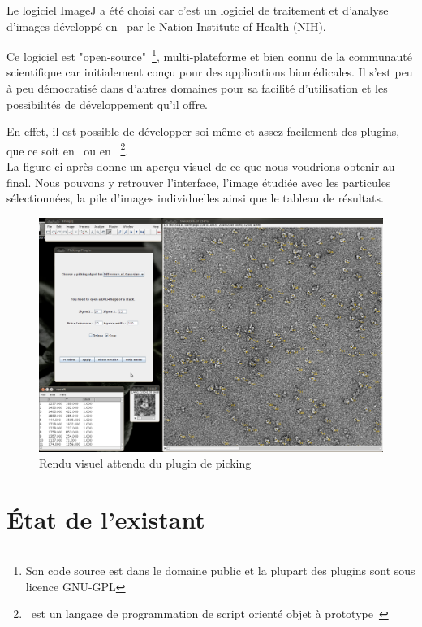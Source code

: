\noindent
Le logiciel ImageJ a été choisi car c'est un logiciel de traitement et d'analyse d'images développé en \java ~par le Nation Institute of Health (NIH).%

\noindent
Ce logiciel est "open-source"~\footnote{Son code source est dans le domaine public et la plupart des plugins sont sous licence GNU-GPL}, multi-plateforme et bien connu de la communauté scientifique car initialement conçu pour des applications biomédicales. Il s'est peu à peu démocratisé dans d'autres domaines pour sa facilité d'utilisation et les possibilités de développement qu'il offre.%

\noindent
En effet, il est possible de développer soi-même et assez facilement des plugins, que ce soit en \java\ ou en \js ~\footnote{\js ~est un langage de programmation de script orienté objet à prototype~\cite{javascript:url}}. \\

La figure ci-après donne un aperçu visuel de ce que nous voudrions obtenir au final. Nous pouvons y retrouver l'interface, l'image étudiée avec les particules sélectionnées, la pile d'images individuelles ainsi que le tableau de résultats. 

\begin{figure}[!ht] 
\begin{center}
\includegraphics[width=1\textwidth]{Visuel.png}
\caption{Rendu visuel attendu du plugin de picking}
\label{visuel}
\end{center}
\end{figure}

\section{\'Etat de l'existant}

